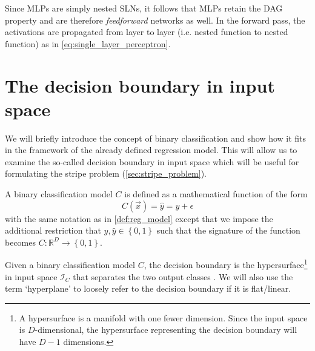 Since MLPs are simply nested SLNs, it follows that MLPs retain the DAG property and are therefore \textit{feedforward} networks as well.
In the forward pass, the activations are propagated from layer to layer (i.e. nested function to nested function) as in \ref{eq:single_layer_perceptron}.

\section{The decision boundary in input space}
We will briefly introduce the concept of binary classification and show how it fits in the framework of the already defined regression model.
This will allow us to examine the so-called decision boundary in input space which will be useful for formulating the stripe problem (\ref{sec:stripe_problem}).

\begin{definition}
    A binary classification model $C$ is defined as a mathematical function of the form
    \begin{equation}
        C(\vec{x}) = \hat{y} = y + \epsilon
    \end{equation}
    with the same notation as in \ref{def:reg_model} except that we impose the additional restriction that $y,\hat{y}\in \left\{0,1 \right\}$ such that the signature of the function becomes $C:\mathbb{R}^D\rightarrow \left\{0,1\right\}$.
\end{definition}
\begin{definition}
    Given a binary classification model $C$, the decision boundary is the hypersurface\footnote{A hypersurface is a manifold with one fewer dimension. Since the input space is $D$-dimensional, the hypersurface representing the decision boundary will have $D-1$ dimensions.} in input space $\mathcal{I}_C$ that separates the two output classes \cite[723]{russell2010}.
    We will also use the term `hyperplane' to loosely refer to the decision boundary if it is flat/linear.
\end{definition}

